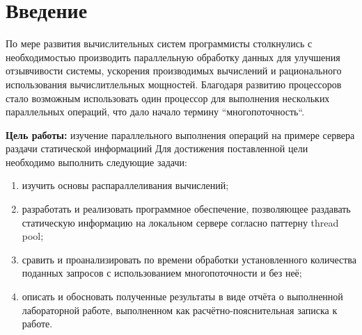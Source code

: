\chapter*{Введение}

По мере развития вычислительных систем программисты столкнулись с необходимостью производить параллельную обработку данных для улучшения отзывчивости системы, ускорения производимых вычислений и рационального использования вычислитлельных мощностей. Благодаря развитию процессоров стало возможным использовать один процессор для выполнения нескольких параллельных операций, что дало начало термину ``многопоточность``.
\newline

\textbf{Цель работы:} изучение параллельного выполнения операций на примере сервера раздачи статической информациий Для достижения поставленной цели необходимо выполнить следующие задачи:
\begin{enumerate}[label=\arabic*)]
	\item изучить основы распараллеливания вычислений;
	\item разработать и реализовать программное обеспечение, позволяющее раздавать статическую информацию на локальном сервере согласно паттерну thread pool;
	\item сравить и проанализировать по времени обработки установленного количества поданных запросов с использованием многопоточности и без неё;
	\item описать и обосновать полученные результаты в виде отчёта о выполненной лабораторной работе, выполненном как расчётно-пояснительная записка к работе.
\end{enumerate}